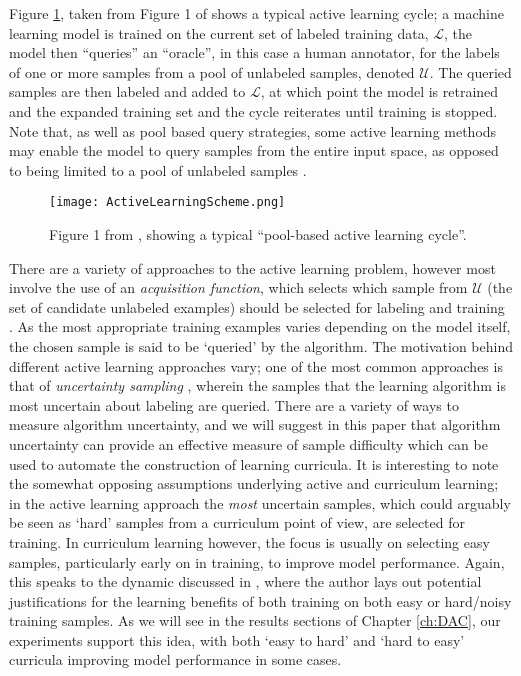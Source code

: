 Figure \ref{ActiveLearningExample}, taken from Figure 1 of \cite{settles2012active} shows a typical active learning cycle; a machine learning model is trained on the current set of labeled training data, $\mathcal{L}$, the model then ``queries'' an ``oracle'', in this case a human annotator, for the labels of one or more samples from a pool of unlabeled  samples, denoted $\mathcal{U}$. The queried samples are then labeled and added to $\mathcal{L}$, at which point the model is retrained and the expanded training set and the cycle reiterates until training is stopped. Note that, as well as pool based query strategies, some active learning methods may enable the model to query samples from the entire input space, as opposed to being limited to a pool of unlabeled samples \cite{settles2012active}.

\begin{figure}[h!]
\centering
\texttt{[image: ActiveLearningScheme.png]}
\caption{Figure 1 from  \cite{settles2012active}, showing a typical ``pool-based active learning cycle''.}
\label{ActiveLearningExample}
\end{figure}

There are a variety of approaches to the active learning problem, however most involve the use of an \textit{acquisition function}, which selects which sample from $\mathcal{U}$ (the set of candidate unlabeled examples) should be selected for labeling and training \cite{settles2012active}. As the most appropriate training examples varies depending on the model itself, the chosen sample is said to be `queried' by the algorithm. The motivation behind different active learning approaches vary; one of the most common approaches is that of \textit{uncertainty sampling} \cite{settles2012active}, wherein the samples that the learning algorithm is most uncertain about labeling are queried. There are a variety of ways to measure algorithm uncertainty, and we will suggest in this paper that algorithm uncertainty can provide an effective measure of sample difficulty which can be used to automate the construction of learning curricula. It is interesting to note the somewhat opposing assumptions underlying active and curriculum learning; in the active learning approach the \textit{most} uncertain samples, which could arguably be seen as `hard' samples from a curriculum point of view, are selected for training. In curriculum learning however, the focus is usually on selecting easy samples, particularly early on in training, to improve model performance. Again, this speaks to the dynamic discussed in \cite{ELMAN199371}, where the author lays out potential justifications for the learning benefits of both training on both easy or hard/noisy training samples. As we will see in the results sections of Chapter \ref{ch:DAC}, our experiments support this idea, with both `easy to hard' and `hard to easy' curricula improving model performance in some cases.

